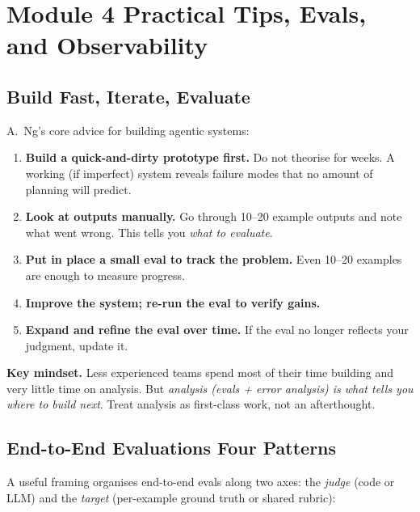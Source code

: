 \documentclass[a4paper,11pt]{article}
\begin{document}
\section{Module 4 \textemdash{} Practical Tips, Evals, and Observability}

\subsection{Build Fast, Iterate, Evaluate}

A.\ Ng's core advice for building agentic systems:

\begin{enumerate}[noitemsep, leftmargin=1.4em]
  \item \textbf{Build a quick-and-dirty prototype first.} Do not
        theorise for weeks. A working (if imperfect) system reveals
        failure modes that no amount of planning will predict.
  \item \textbf{Look at outputs manually.} Go through 10–20 example
        outputs and note what went wrong. This tells you
        \textit{what to evaluate}.
  \item \textbf{Put in place a small eval to track the problem.} Even
        10–20 examples are enough to measure progress.
  \item \textbf{Improve the system; re-run the eval to verify gains.}
  \item \textbf{Expand and refine the eval over time.} If the eval
        no longer reflects your judgment, update it.
\end{enumerate}

\begin{ambercallout}
\textbf{Key mindset.}
Less experienced teams spend most of their time building and very
little time on analysis. But \emph{analysis (evals + error analysis)
is what tells you where to build next}. Treat analysis as first-class
work, not an afterthought.
\end{ambercallout}

\subsection{End-to-End Evaluations \textemdash{} Four Patterns}

A useful framing organises end-to-end evals along two axes: the
\textit{judge} (code or LLM) and the \textit{target} (per-example
ground truth or shared rubric):
\end{document}
